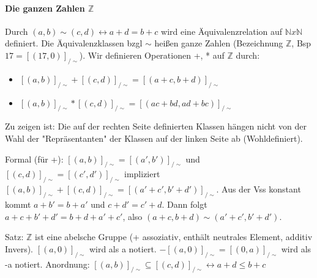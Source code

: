 \documentclass[a4paper]{article}
\begin{document}
\begin{multicols}{3}
    \paragraph{Die ganzen Zahlen $\mathbb{Z}$}
    Durch $(a,b)\sim (c,d)\leftrightarrow a+d=b+c$ wird eine Äquivalenzrelation auf $\mathbb{N} x\mathbb{N}$ definiert.
    Die Äquivalenzklassen bzgl $\sim$ heißen ganze Zahlen (Bezeichnung $\mathbb{Z}$, Bsp $17=[(17,0)]_{/\sim }$).
    Wir definieren Operationen +, * auf $\mathbb{Z}$ durch:
    \begin{itemize}
        \item $[(a,b)]_{/\sim } + [(c,d)]_{/\sim } = [(a+c, b+d)]_{/\sim }$
        \item $[(a,b)]_{/\sim } * [(c,d)]_{/\sim } = [(ac+bd, ad+bc)]_{/\sim }$
    \end{itemize}
    Zu zeigen ist: Die auf der rechten Seite definierten Klassen hängen nicht von der Wahl der "Repräsentanten" der Klassen auf der linken Seite ab (Wohldefiniert).
    
    Formal (für +): $[(a,b)]_{/\sim } = [(a',b')]_{/\sim }$ und $[(c,d)]_{/\sim } = [(c',d')]_{/\sim }$ impliziert $[(a,b)]_{/\sim } + [(c,d)]_{/\sim } = [(a'+c', b'+d')]_{/\sim }$. Aus der Vss konstant kommt $a+b'=b+a'$ und $c+d'=c'+d$. Dann folgt $a+c+b'+d'=b+d+a'+c'$, also $(a+c, b+d)\sim (a'+c',b'+d')$.
    
    Satz: $\mathbb{Z}$ ist eine abelsche Gruppe (+ assoziativ, enthält neutrales Element, additiv Invers).
    $[(a,0)]_{/\sim }$ wird als a notiert. $-[(a,0)]_{/\sim }=[(0,a)]_{/\sim }$ wird als -a notiert.
    Anordnung: $[(a,b)]_{/\sim } \subseteq [(c,d)]_{/\sim } \leftrightarrow a+d\leq b+c$
    

\end{multicols}
\end{document}
